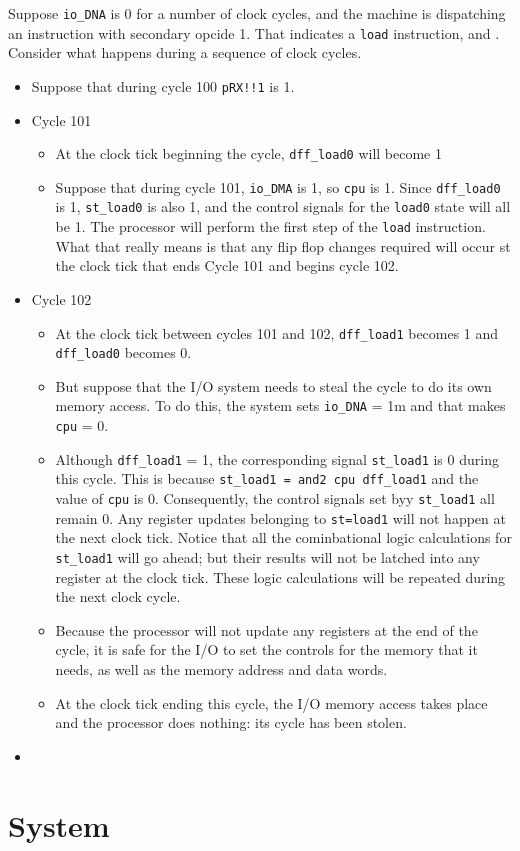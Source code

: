 \documentclass[11pt]{article}
\begin{document}
Suppose \texttt{io\_DNA} is 0 for a  number of clock cycles, and the machine
is dispatching an instruction with secondary opcide 1.  That indicates
a \texttt{load} instruction, and .  Consider what happens during
a sequence of clock cycles.
\begin{itemize}
\item Suppose that during cycle 100 \texttt{pRX!!1} is 1.
\item Cycle 101
\begin{itemize}
\item At the clock tick beginning the cycle, \texttt{dff\_load0} will become 1
\item Suppose that during cycle 101, \texttt{io\_DMA} is 1, so \texttt{cpu} is 1.
Since \texttt{dff\_load0} is 1, \texttt{st\_load0} is also 1, and the control
signals for the \texttt{load0} state will all be 1.  The processor will
perform the first step of the \texttt{load} instruction.  What that
really means is that any flip flop changes required will occur st
the clock tick that ends Cycle 101 and begins cycle 102.
\end{itemize}
\item Cycle 102
\begin{itemize}
\item At the clock tick between cycles 101 and 102, \texttt{dff\_load1} becomes
1 and \texttt{dff\_load0} becomes 0.
\item But suppose that the  I/O system needs to steal the cycle to do
its own memory access.  To do this, the system sets \texttt{io\_DNA} = 1m
and that makes \texttt{cpu} = 0.
\item Although \texttt{dff\_load1} = 1, the corresponding signal \texttt{st\_load1} is 0
during this cycle.  This is because \texttt{st\_load1 = and2 cpu
    dff\_load1} and the value of \texttt{cpu} is 0.  Consequently, the control
signals set byy \texttt{st\_load1} all remain 0.  Any register updates
belonging to \texttt{st=load1} will not happen at the next clock tick.
Notice that all the cominbational logic calculations for
\texttt{st\_load1} will go ahead; but their results will not be latched
into any register at the clock tick.  These logic calculations
will be repeated during the next clock cycle.
\item Because the processor will not update any registers at the end of
the cycle, it is safe for the I/O to set the controls for the
memory that it needs, as well as the memory address and data words.
\item At the clock tick ending this cycle, the I/O memory access takes
place and the processor does nothing: its cycle has been stolen.
\end{itemize}
\item 
\end{itemize}

\section{System}
\label{sec:orgc1afc92}
\end{document}
